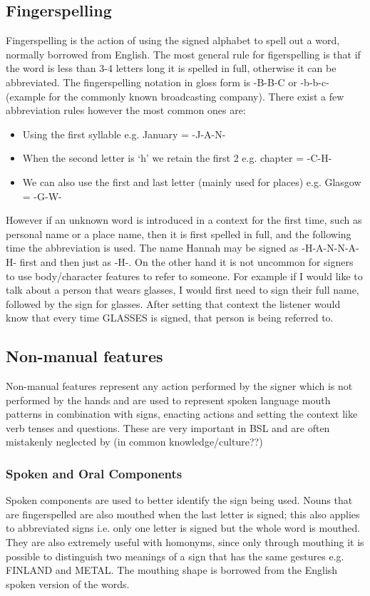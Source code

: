 \documentclass[12pt]{ociamthesis}  %
\begin{document}
\subsection{Fingerspelling}
Fingerspelling is the action of using the signed alphabet to spell out a word, normally borrowed from English. The most general rule for figerspelling is that if the word is less than 3-4 letters long it is spelled in full, otherwise it can be abbreviated. The fingerspelling notation in gloss form is -B-B-C or -b-b-c- (example for the commonly known broadcasting company). There exist a few abbreviation rules however the most common ones are:
\begin{itemize}
	\item Using the first syllable e.g. January = -J-A-N-
	\item When the second letter is `h' we retain the first 2 e.g. chapter = -C-H-
	\item We can also use the first and last letter (mainly used for places) e.g. Glasgow = -G-W-
\end{itemize}
However if an unknown word is introduced in a context for the first time, such as personal name or a place name, then it is first spelled in full, and the following time the abbreviation is used. The name Hannah may be signed as -H-A-N-N-A-H- first and then just as -H-. On the other hand it is not uncommon for signers to use body/character features to refer to someone. For example if I would like to talk about a person that wears glasses, I would first need to sign their full name, followed by the sign for glasses. After setting that context the listener would know that every time GLASSES is signed, that person is being referred to.

\subsection{Non-manual features}
Non-manual features represent any action performed by the signer which is not performed by the hands and are used to represent spoken language mouth patterns in combination with signs, enacting actions and setting the context like verb tenses and questions. These are very important in BSL and are often mistakenly neglected by (in common knowledge/culture??)
\subsubsection{Spoken and Oral Components}
Spoken components are used to better identify the sign being used. Nouns that are fingerspelled are also mouthed when the last letter is signed; this also applies to abbreviated signs i.e. only one letter is signed but the whole word is mouthed. They are also extremely useful with homonyms, since only through mouthing it is possible to distinguish two meanings of a sign that has the same gestures e.g. FINLAND and METAL. The mouthing shape is borrowed from the English spoken version of the words.
\end{document}
